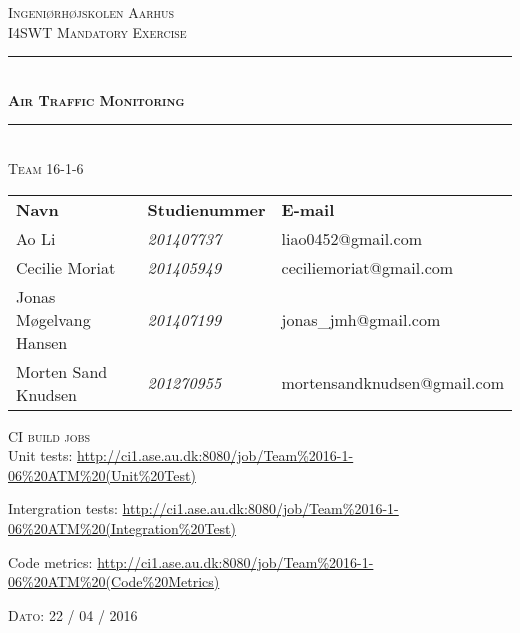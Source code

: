 \newcommand{\HRule}{\rule{\linewidth}{0.1mm}} %
\pagestyle{empty}
\begin{center}
	\vspace{3cm}
	\textsc{\LARGE Ingeniørhøjskolen Aarhus}\\[1.5cm] %
	
	\textsc{\large I4SWT Mandatory Exercise}\\[2.5cm] 
	\HRule \\[0.8cm]
	{\huge \bfseries \textsc{Air Traffic Monitoring}} \\[0.5cm]{\LARGE }
	\HRule \\[1.5cm]
	
	\textsc{\large Team 16-1-6}\\
	\vspace{0.5 in}
	\begin{center}
		\begin{tabular}{l l l}
			\textbf{Navn} & \textbf{Studienummer} & \textbf{E-mail} \\
			Ao Li & \textsl{201407737} &  liao0452@gmail.com  \\
			Cecilie Moriat & \textsl{201405949} & ceciliemoriat@gmail.com \\
			Jonas Møgelvang Hansen & \textsl{201407199} & jonas\_jmh@gmail.com \\
			Morten Sand Knudsen & \textsl{201270955} & mortensandknudsen@gmail.com \\
			
		\end{tabular}
	\end{center}
	\vspace{1 in}
	
	\textsc{\large CI build jobs}\\
	\vspace{0.3 in}
	Unit tests:	
	\url{http://ci1.ase.au.dk:8080/job/Team%2016-1-06%20ATM%20(Unit%20Test)}

	Intergration tests:
	\url{http://ci1.ase.au.dk:8080/job/Team%2016-1-06%20ATM%20(Integration%20Test)}
		
	Code metrics:
	\url{http://ci1.ase.au.dk:8080/job/Team%2016-1-06%20ATM%20(Code%20Metrics)}
	

	\vspace{0.5 in}
	
	\textsc{\large Dato: 22 / 04 / 2016}\\
	\vfill %
	
\end{center} %

\clearpage

